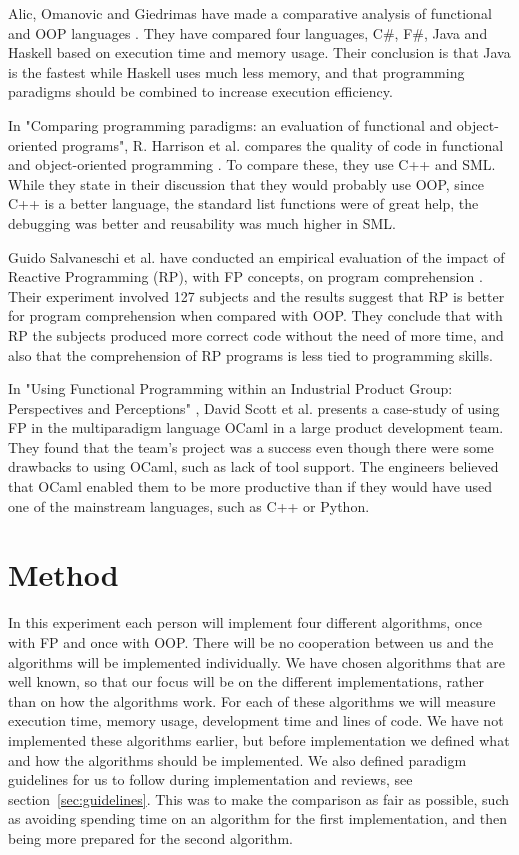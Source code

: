 \documentclass {article}
\begin{document}
Alic, Omanovic and Giedrimas have made a comparative analysis of functional and OOP languages \cite{alomgi}. They have compared four languages, C\#, F\#, Java and Haskell based on execution time and memory usage. Their conclusion is that Java is the fastest while Haskell uses much less memory, and that programming paradigms should be combined to increase execution efficiency. 
 
In "Comparing programming paradigms: an evaluation of functional and object-oriented programs", R. Harrison et al. compares the quality of code in functional and object-oriented programming \cite{hasmadole}. To compare these, they use C++ and SML. While they state in their discussion that they would probably use OOP, since C++ is a better language, the standard list functions were of great help, the debugging was better and reusability was much higher in SML.
 
Guido Salvaneschi et al. have conducted an empirical evaluation of the impact of Reactive Programming (RP), with FP concepts, on program comprehension \cite{saproamname}. Their experiment involved 127 subjects and the results suggest that RP is better for program comprehension when compared with OOP. They conclude that with RP the subjects produced more correct code without the need of more time, and also that the comprehension of RP programs is less tied to programming skills. 
 
In "Using Functional Programming within an Industrial Product Group: Perspectives and Perceptions" \cite{scomad}, David Scott et al. presents a case-study of using FP in the multiparadigm language OCaml in a large product development team. They found that the team's project was a success even though there were some drawbacks to using OCaml, such as lack of tool support. The engineers believed that OCaml enabled them to be more productive than if they would have used one of the mainstream languages, such as C++ or Python.
\newpage
\section{Method}
In this experiment each person will implement four different algorithms, once with FP and once with OOP. There will be no cooperation between us and the algorithms will be implemented individually. We have chosen algorithms that are well known, so that our focus will be on the different implementations, rather than on how the algorithms work. For each of these algorithms we will measure execution time, memory usage, development time and lines of code. We have not implemented these algorithms earlier, but before implementation we defined what and how the algorithms should be implemented. We also defined paradigm guidelines for us to follow during implementation and reviews, see section~\ref{sec:guidelines}. This was to make the comparison as fair as possible, such as avoiding spending time on an algorithm for the first implementation, and then being more prepared for the second algorithm.
 
\end{document}
